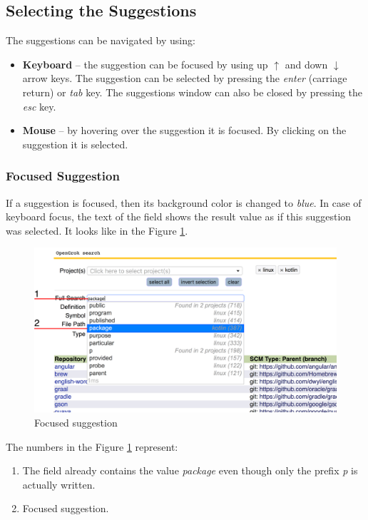 \subsection{Selecting the Suggestions}
The suggestions can be navigated by using:
\begin {itemize}
    \item \textbf{Keyboard} – the suggestion can be focused by using up $\uparrow$ and down $\downarrow$ arrow keys.
    The suggestion can be selected by pressing the \textit{enter} (carriage return) or \textit{tab} key.
    The suggestions window can also be closed by pressing the \textit{esc} key.
    \item \textbf{Mouse} – by hovering over the suggestion it is focused. By clicking on the suggestion it
    is selected.
\end{itemize}

\subsubsection{Focused Suggestion}
If a suggestion is focused, then its background color is changed to \textit{blue}. In case of keyboard focus,
the text of the field shows the result value as if this suggestion was selected.
It looks like in the Figure \ref{suggestion_focused}.

\begin{figure}[htbp]
    \centering
    \includegraphics[width=145mm]{../img/suggestions_focused.png}
    \caption{Focused suggestion}
    \label{suggestion_focused}
\end{figure}

The numbers in the Figure \ref{suggestion_focused} represent:
\begin{enumerate}
    \item The field already contains the value \textit{package} even though only the prefix \textit{p} is actually written.
    \item Focused suggestion.
\end{enumerate}

